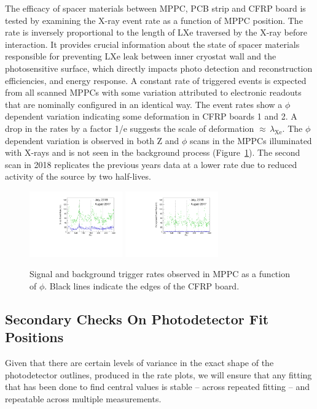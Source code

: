 The efficacy of spacer materials between MPPC, PCB strip and CFRP
board is tested by examining the X-ray event rate as a function of
MPPC position. The rate is inversely proportional to the length of LXe
traversed by the X-ray before interaction.  It provides crucial
information about the state of spacer materials responsible for
preventing LXe leak between inner cryostat wall and the photosensitive
surface, which directly impacts photo detection and reconstruction
efficiencies, and energy response.  A constant rate of triggered
events is expected from all scanned MPPCs with some variation
attributed to electronic readouts that are nominally configured in an
identical way.  The event rates show a $\phi$ dependent variation
indicating some deformation in CFRP boards 1 and 2.  A drop in the
rates by a factor 1/e suggests the scale of deformation
$\approx\,\lambda_{\mathrm{Xe}}$.  The $\phi$ dependent variation is
observed in both Z and $\phi$ scans in the MPPCs illuminated with
X-rays and is not seen in the background process
(Figure~\ref{fig:ratesvszphi}).  The second scan in 2018 replicates
the previous years data at a lower rate due to reduced activity of the
source by two half-lives.  \begin{figure}[]
\includegraphics[width=4cm]{plots/2018/cEventRate_1718}
\includegraphics[width=4cm]{plots/2018/cBkgRate_1718} \caption{Signal
and background trigger rates observed in MPPC as a function of $\phi$.
Black lines indicate the edges of the CFRP board.}
\label{fig:ratesvszphi} \end{figure}





\subsection{Secondary Checks On Photodetector Fit Positions}
Given that there are certain levels of variance in the exact shape of the photodetector outlines, produced in the rate plots, we will ensure that any fitting that has been done to find central values is stable -- across repeated fitting -- and repeatable across multiple measurements.

